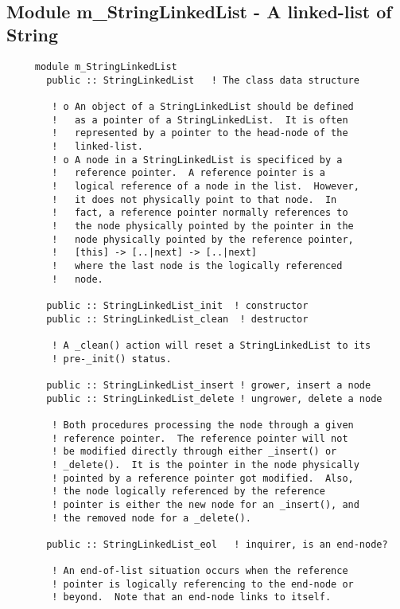 
 
 
\mbox{}\hrulefill\ 
 
  \subsection{Module m\_StringLinkedList - A linked-list of String }

\begin{verbatim} 
     module m_StringLinkedList
       public :: StringLinkedList	! The class data structure
 
 		! o An object of a StringLinkedList should be defined
 		!   as a pointer of a StringLinkedList.  It is often
 		!   represented by a pointer to the head-node of the
 		!   linked-list.
 		! o A node in a StringLinkedList is specificed by a
 		!   reference pointer.  A reference pointer is a
 		!   logical reference of a node in the list.  However,
 		!   it does not physically point to that node.  In
 		!   fact, a reference pointer normally references to
 		!   the node physically pointed by the pointer in the
 		!   node physically pointed by the reference pointer,
 		!	[this] -> [..|next] -> [..|next]
 		!   where the last node is the logically referenced
 		!   node.
 
       public :: StringLinkedList_init	! constructor
       public :: StringLinkedList_clean  ! destructor
 
 		! A _clean() action will reset a StringLinkedList to its
 		! pre-_init() status.
 
       public :: StringLinkedList_insert ! grower, insert a node
       public :: StringLinkedList_delete ! ungrower, delete a node
 
 		! Both procedures processing the node through a given
 		! reference pointer.  The reference pointer will not
 		! be modified directly through either _insert() or
 		! _delete().  It is the pointer in the node physically
 		! pointed by a reference pointer got modified.  Also,
 		! the node logically referenced by the reference
 		! pointer is either the new node for an _insert(), and
 		! the removed node for a _delete().
 
       public :: StringLinkedList_eol	! inquirer, is an end-node?
 
 		! An end-of-list situation occurs when the reference
 		! pointer is logically referencing to the end-node or
 		! beyond.  Note that an end-node links to itself.
 

\end{verbatim}
